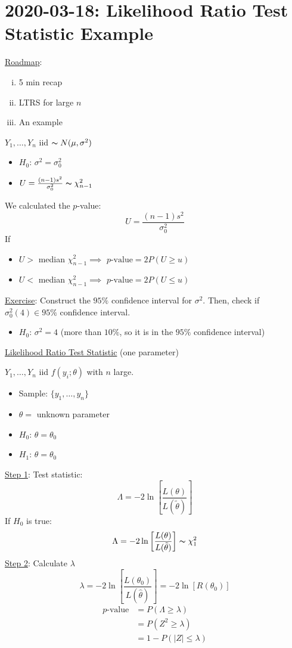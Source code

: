 \section{2020-03-18: Likelihood Ratio Test Statistic Example}
\underline{Roadmap}:
\begin{enumerate}[(i)]
    \item 5 min recap
    \item LTRS for large $ n $
    \item An example
\end{enumerate}

$ Y_1,\ldots ,Y_n $ iid $ \thicksim N(\mu,\sigma^2) $
\begin{itemize}
    \item $ H_0 $: $ \sigma^2=\sigma_0^2 $
    \item $ U=\frac{(n-1)s^2}{\sigma_0^2} \thicksim \chi^2_{n-1} $
\end{itemize}
We calculated the $ p $-value:
\[ U=\frac{(n-1)s^2}{\sigma_0^2}  \]
If
\begin{itemize}
    \item $ U > $ median $ \chi^2_{n-1} \implies $ $ p\text{-value}=2P(U\geqslant u) $
    \item $ U < $ median $ \chi^2_{n-1} \implies $ $ p\text{-value}=2P(U\leqslant u) $
\end{itemize}
\underline{Exercise}: Construct the $ 95\% $ confidence interval for $ \sigma^2 $.
Then, check if $ \sigma_0^2(4)\in 95\% $ confidence interval.
\begin{itemize}
    \item $ H_0 $: $ \sigma^2=4 $ (more than $ 10\% $, so it is in the $ 95\% $
          confidence interval)
\end{itemize}

\underline{Likelihood Ratio Test Statistic} (one parameter)

$ Y_1,\ldots ,Y_n $ iid $ f(y_i;\theta) $ with $ n $ large.
\begin{itemize}
    \item Sample: $ \{y_1,\ldots ,y_n\} $
    \item $ \theta= $ unknown parameter
    \item $ H_0 $: $ \theta=\theta_0 $
    \item $ H_1 $: $ \theta=\theta_0 $
\end{itemize}
\underline{Step 1}: Test statistic:
\[ \Lambda=-2\ln\left[ \frac{L(\theta)}{L(\tilde{\theta})}  \right] \]
If $ H_0 $ is true:
\[ \Lambda=-2\ln\left[ \frac{L(\theta)}{L(\tilde{\theta})}  \right]
    \thicksim \chi^2_{1} \]
\underline{Step 2}: Calculate $ \lambda $
\[ \lambda=-2\ln\left[ \frac{L(\theta_0)}{L(\hat{\theta})}  \right]=-2\ln
    \left[ R(\theta_0) \right] \]
\begin{align*}
    p\text{-value}
     & =P(\Lambda\geqslant \lambda) \\
     & =P(Z^2\geqslant \lambda)     \\
     & =1-P(|Z|\leqslant \lambda)
\end{align*}

